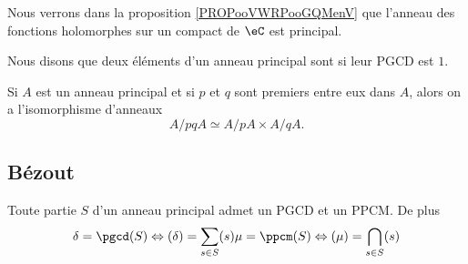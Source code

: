 \begin{example}
    Nous verrons dans la proposition \ref{PROPooVWRPooGQMenV} que l'anneau des fonctions holomorphes sur un compact de \( \eC\) est principal.
\end{example}

\begin{definition}      \label{DEFooXSPFooPumQSy}
Nous disons que deux éléments d'un anneau principal sont  si leur PGCD est \( 1\).
\end{definition}

\begin{theorem}        \label{ThofPXwiM}
    Si \( A\) est un anneau principal et si \( p\) et \( q\) sont premiers entre eux dans \( A\), alors on a l'isomorphisme d'anneaux
    \begin{equation}
        A/pqA\simeq A/pA\times A/qA.
    \end{equation}
\end{theorem}

\subsection{Bézout}

\begin{theorem}
    Toute partie \( S\) d'un anneau principal admet un PGCD et un PPCM. De plus
    \begin{equation}
        \begin{aligned}[]
            \delta=\pgcd(S)\Leftrightarrow (\delta)=\sum_{s\in S}(s)
            \mu=\ppcm(S)\Leftrightarrow (\mu)=\bigcap_{s\in S}(s)
        \end{aligned}
    \end{equation}
\end{theorem}

